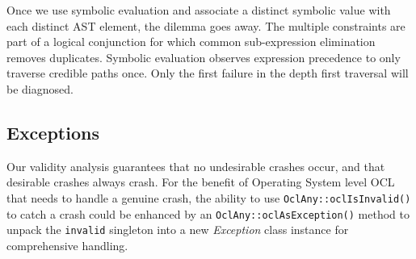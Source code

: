 \documentclass[
]{ceurart}
\begin{document}

Once we use symbolic evaluation and associate a distinct symbolic value with each distinct AST element, the dilemma goes away. The multiple constraints are part of a logical conjunction for which common sub-expression elimination removes duplicates. Symbolic evaluation observes expression precedence to only traverse credible paths once. Only the first failure in the depth first traversal will be diagnosed.


\subsection{Exceptions}

Our validity analysis guarantees that no undesirable crashes occur, and that desirable crashes always crash. For the benefit of Operating System level OCL that needs to handle a genuine crash, the ability to use \verb|OclAny::oclIsInvalid()| to catch a crash could be enhanced by an \verb|OclAny::oclAsException()| method to unpack the \verb|invalid| singleton into a new \emph{Exception} class instance for comprehensive handling.




\end{document}
